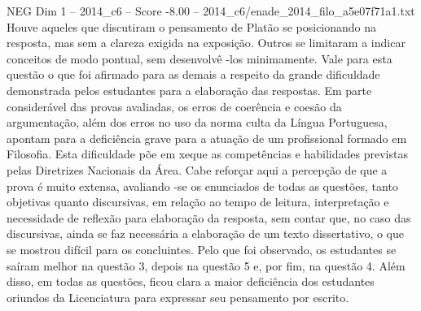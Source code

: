 \begin{textsample}{NEG Dim 1 – 2014\_c6 – Score -8.00 – 2014\_c6/enade\_2014\_filo\_a5e07f71a1.txt}
Houve aqueles que discutiram o pensamento de Platão se posicionando na resposta, mas sem a clareza exigida na exposição.
Outros se limitaram a indicar conceitos de modo pontual, sem desenvolvê -los minimamente.
Vale para esta questão o que foi afirmado para as demais a respeito da grande dificuldade demonstrada pelos estudantes para a elaboração das respostas.
Em parte considerável das provas avaliadas, os erros de coerência e coesão da argumentação, além dos erros no uso da norma culta da Língua Portuguesa, apontam para a deficiência grave para a atuação de um profissional formado em Filosofia.
Esta dificuldade põe em xeque as competências e habilidades previstas pelas Diretrizes Nacionais da Área.
Cabe reforçar aqui a percepção de que a prova é muito extensa, avaliando -se os enunciados de todas as questões, tanto objetivas quanto discursivas, em relação ao tempo de leitura, interpretação e necessidade de reflexão para elaboração da resposta, sem contar que, no caso das discursivas, ainda se faz necessária a elaboração de um texto dissertativo, o que se mostrou difícil para os concluintes.
Pelo que foi observado, os estudantes se saíram melhor na questão 3, depois na questão 5 e, por fim, na questão 4.
Além disso, em todas as questões, ficou clara a maior deficiência dos estudantes oriundos da Licenciatura para expressar seu pensamento por escrito.

\end{textsample}
